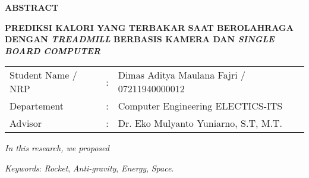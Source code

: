 \begin{center}
  \large\textbf{ABSTRACT}
\end{center}


\vspace{2ex}

\begingroup
  \begin{center}
    \textbf{PREDIKSI KALORI YANG TERBAKAR SAAT BEROLAHRAGA DENGAN \emph{TREADMILL} BERBASIS KAMERA DAN \emph{SINGLE BOARD COMPUTER}}
  \end{center}

  \setlength{\tabcolsep}{0pt}

  \noindent
  \begin{tabularx}{\textwidth}{l >{\centering}m{3em} X}
    Student Name / NRP  &:& Dimas Aditya Maulana Fajri / 07211940000012 \\

    Departement         &:& Computer Engineering ELECTICS-ITS\\

    Advisor             &:& Dr. Eko Mulyanto Yuniarno, S.T, M.T. \\
  \end{tabularx}
\endgroup

\emph{In this research, we proposed \lipsum[1]}

\emph{Keywords}: \emph{Rocket}, \emph{Anti-gravity}, \emph{Energy}, \emph{Space}.
